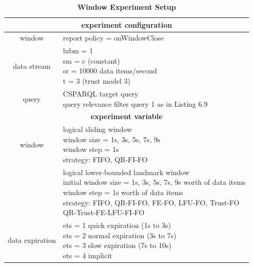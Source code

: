 \begin{table}[!htbp]
	\centering
    \caption{\textbf{Window Experiment Setup}}
    \label{tab:6-wes}
    \begin{tabular}{|c|l|} \hline
    \multicolumn{2}{|c|}{\textbf{experiment configuration}} \\ \hline
    window & report policy = onWindowClose \\ \hline
    data stream & \makecell[l]{lubm = 1 \\ sm = c (constant) \\ sr = 10000 data items/second \\ t = 3 (trust model 3)} \\ \hline
    query & \makecell[l]{CSPARQL target query \\ query relevance filter query 1 as in Listing 6.9} \\ \hline
    \multicolumn{2}{|c|}{\textbf{experiment variable}} \\ \hline
    window & \makecell[l]{logical sliding window \\ window size = 1s, 3s, 5s, 7s, 9s \\ window step = 1s \\ strategy: FIFO, QR-FI-FO} \\ \cline{2-2}
           & \makecell[l]{logical lower-bounded landmark window \\ initial window size = 1s, 3s, 5s, 7s, 9s worth of data items \\ window step = 1s worth of data items \\ strategy: FIFO, QR-FI-FO, FE-FO, LFU-FO, Trust-FO \\ QR-Trust-FE-LFU-FI-FO} \\ \hline
    data expiration & \makecell[l]{ets = 1 quick expiration (1s to 3s) \\ ets = 2 normal expiration (3s to 7s) \\ ets = 3 slow expiration (7s to 10s) \\ ets = 4 implicit} \\ \hline
    \end{tabular}
\end{table}

